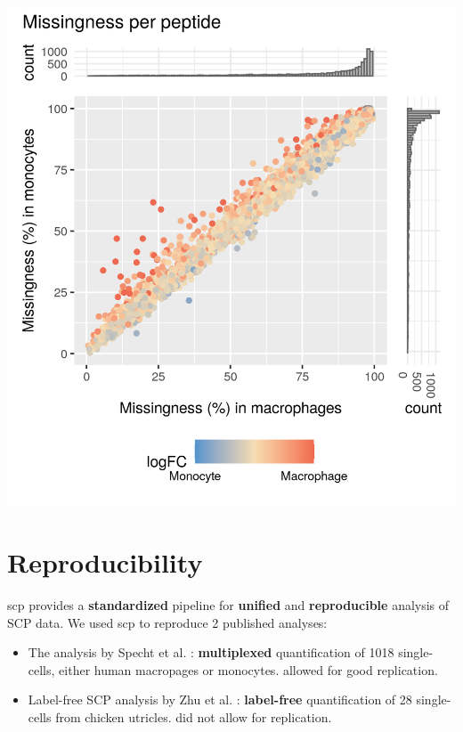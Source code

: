 \documentclass{article}
\newcommand{\hcode}[2][lgray]{{\ttfamily\color{vdgray}\colorbox{#1}{#2}}}
\begin{document}
\begin{multicols}{2}
\begin{minipage}[h]{0.35\linewidth}
\end{minipage}\hspace{0.45cm}
\begin{minipage}[h]{0.6\linewidth}
  \includegraphics[width=\linewidth]{figs/missing_peptide.png}
  
\end{minipage}


\noindent
\begin{minipage}[t]{\linewidth}
  \section*{\huge Reproducibility}
  
  \hcode{scp} provides a \textbf{standardized} pipeline for 
  \textbf{unified} and \textbf{reproducible} analysis of SCP data. We 
  used \hcode{scp} to reproduce 2 published analyses:
  
  \begin{itemize}
    \item The analysis by Specht et al. \cite{Specht2020-jm}: 
    \textbf{multiplexed} quantification of 1018 single-cells, either 
    human macropages or monocytes. \textbf{\color{OliveGreen}{Good 
    documentation}} allowed for good replication.
    \item Label-free SCP analysis by Zhu et al. \cite{Zhu2019-ja}: 
    \textbf{label-free} quantification of 28 single-cells from chicken 
    utricles. \textbf{\color{BrickRed}{Poor documentation}} did not 
    allow for replication.
  \end{itemize}
  

\end{minipage}
\end{multicols}
\end{document}
